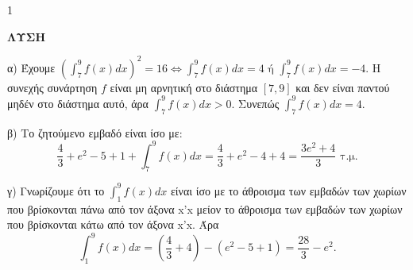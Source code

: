 \begin{ylh}{1}
    \item [Ύλη από εικόνα]
\end{ylh}
\textbf{ΛΥΣΗ}
\begin{alist}
    \item α) Έχουμε $\left(\int_{7}^{9} f(x) dx\right)^2 = 16 \Leftrightarrow \int_{7}^{9} f(x) dx = 4 \text{ ή } \int_{7}^{9} f(x) dx = -4$.
    Η συνεχής συνάρτηση $f$ είναι μη αρνητική στο διάστημα $[7,9]$ και δεν είναι παντού μηδέν στο διάστημα αυτό, άρα $\int_{7}^{9} f(x) dx > 0$. Συνεπώς $\int_{7}^{9} f(x) dx = 4$.

    \item β) Το ζητούμενο εμβαδό είναι ίσο με:
    \[ \frac{4}{3} + e^2 - 5 + 1 + \int_{7}^{9} f(x) dx = \frac{4}{3} + e^2 - 4 + 4 = \frac{3e^2 + 4}{3} \text{ τ.μ.} \]

    \item γ) Γνωρίζουμε ότι το $\int_{1}^{9} f(x) dx$ είναι ίσο με το άθροισμα των εμβαδών των χωρίων που βρίσκονται πάνω από τον άξονα x'x μείον το άθροισμα των εμβαδών των χωρίων που βρίσκονται κάτω από τον άξονα x'x.
    Άρα
    \[ \int_{1}^{9} f(x) dx = \left(\frac{4}{3} + 4\right) - (e^2 - 5 + 1) = \frac{28}{3} - e^2. \]
\end{alist}
